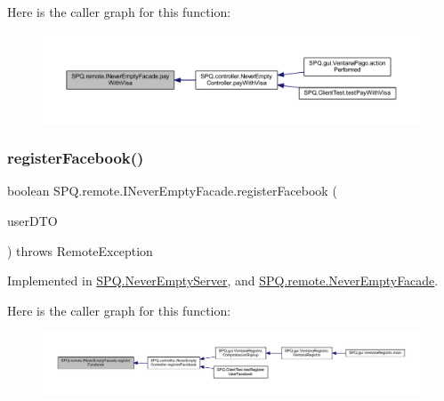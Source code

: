 Here is the caller graph for this function\+:
\nopagebreak
\begin{figure}[H]
\begin{center}
\leavevmode
\includegraphics[width=350pt]{interface_s_p_q_1_1remote_1_1_i_never_empty_facade_a3b7058d95e7b73bdcc09220ecfc2d744_icgraph}
\end{center}
\end{figure}
\mbox{\label{interface_s_p_q_1_1remote_1_1_i_never_empty_facade_a7b2f025522489fe9070d09a4fb08f0a1}} 
\subsubsection{\texorpdfstring{register\+Facebook()}{registerFacebook()}}
{\footnotesize\ttfamily boolean S\+P\+Q.\+remote.\+I\+Never\+Empty\+Facade.\+register\+Facebook (\begin{DoxyParamCaption}\item[{\mbox{\hyperlink{class_s_p_q_1_1dto_1_1_user_d_t_o}{User\+D\+TO}}}]{user\+D\+TO }\end{DoxyParamCaption}) throws Remote\+Exception}



Implemented in \mbox{\hyperlink{class_s_p_q_1_1_never_empty_server_abf7e271e0edb91e8f8ed73063de74b03}{S\+P\+Q.\+Never\+Empty\+Server}}, and \mbox{\hyperlink{class_s_p_q_1_1remote_1_1_never_empty_facade_aa9845001ecd5228135d64415a4c12b20}{S\+P\+Q.\+remote.\+Never\+Empty\+Facade}}.

Here is the caller graph for this function\+:
\nopagebreak
\begin{figure}[H]
\begin{center}
\leavevmode
\includegraphics[width=350pt]{interface_s_p_q_1_1remote_1_1_i_never_empty_facade_a7b2f025522489fe9070d09a4fb08f0a1_icgraph}
\end{center}
\end{figure}
\mbox{\label{interface_s_p_q_1_1remote_1_1_i_never_empty_facade_a93f3250c09a26fdb1d65219599dfd542}} 
